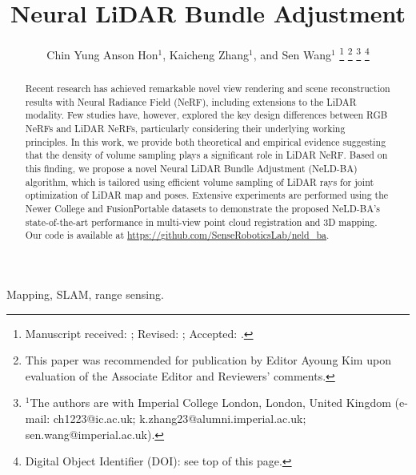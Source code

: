 \documentclass[letterpaper,journal,twoside]{IEEEtran}  %
\title{Neural LiDAR Bundle Adjustment}
\author{Chin Yung Anson Hon$^{1}$, Kaicheng Zhang$^{1}$, and Sen Wang$^{1}$%
\thanks{Manuscript received: \datereceived; Revised: \daterevised; Accepted: \dateaccepted.}%
\thanks{This paper was recommended for publication by Editor Ayoung Kim upon evaluation of the Associate Editor and Reviewers' comments.}%
\thanks{$^{1}$The authors are with Imperial College London, London, United Kingdom
        (e-mail: ch1223@ic.ac.uk; k.zhang23@alumni.imperial.ac.uk; sen.wang@imperial.ac.uk).}%
\thanks{Digital Object Identifier (DOI): see top of this page.}%
}
\begin{document}
\maketitle

\begin{abstract}
    Recent research has achieved remarkable novel view rendering and scene reconstruction results with Neural Radiance Field (NeRF), including extensions to the LiDAR modality. Few studies have, however, explored the key design differences between RGB NeRFs and LiDAR NeRFs, particularly considering their underlying working principles. In this work, we provide both theoretical and empirical evidence suggesting that the density of volume sampling plays a significant role in LiDAR NeRF. Based on this finding, we propose a novel Neural LiDAR Bundle Adjustment (NeLD-BA) algorithm, which is tailored using efficient volume sampling of LiDAR rays for joint optimization of LiDAR map and poses. Extensive experiments are performed using the Newer College and FusionPortable datasets to demonstrate the proposed NeLD-BA's state-of-the-art performance in multi-view point cloud registration and 3D mapping. Our code is available at \url{https://github.com/SenseRoboticsLab/neld_ba}.
\end{abstract}

\begin{IEEEkeywords}
Mapping, SLAM, range sensing.
\end{IEEEkeywords}

















\end{document}
